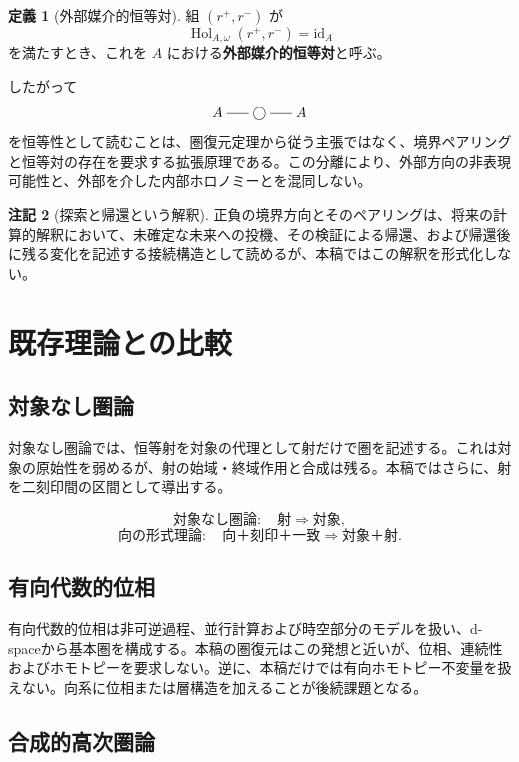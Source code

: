 \documentclass[a4paper,11pt]{ltjsarticle}
\theoremstyle{definition}
\newtheorem{definition}{定義}[section]
\newtheorem{remark}[definition]{注記}
\theoremstyle{plain}
\newcommand{\Hol}{\operatorname{Hol}}
\newcommand{\id}{\mathrm{id}}
\newcommand{\dfix}{\bigcirc}
\newcommand{\dline}{\mathrel{\rule[0.55ex]{1.6em}{0.4pt}}}
\begin{document}
\begin{definition}[外部媒介的恒等対]
組 $(r^+,r^-)$ が
\[
 \Hol_{A,\omega}(r^+,r^-)=\id_A
\]
を満たすとき、これを $A$ における\textbf{外部媒介的恒等対}と呼ぶ。
\end{definition}

したがって
\[
 A\dline\dfix\dline A
\]
を恒等性として読むことは、圏復元定理から従う主張ではなく、境界ペアリングと恒等対の存在を要求する拡張原理である。この分離により、外部方向の非表現可能性と、外部を介した内部ホロノミーとを混同しない。

\begin{remark}[探索と帰還という解釈]
正負の境界方向とそのペアリングは、将来の計算的解釈において、未確定な未来への投機、その検証による帰還、および帰還後に残る変化を記述する接続構造として読めるが、本稿ではこの解釈を形式化しない。
\end{remark}

\section{既存理論との比較}

\subsection{対象なし圏論}

対象なし圏論では、恒等射を対象の代理として射だけで圏を記述する\cite{HellerKról2016}。これは対象の原始性を弱めるが、射の始域・終域作用と合成は残る。本稿ではさらに、射を二刻印間の区間として導出する。

\[
 \text{対象なし圏論}:
 \quad\text{射}\Longrightarrow\text{対象},
\]
\[
 \text{向の形式理論}:
 \quad\text{向＋刻印＋一致}
 \Longrightarrow\text{対象＋射}.
\]

\subsection{有向代数的位相}

有向代数的位相は非可逆過程、並行計算および時空部分のモデルを扱い、d-spaceから基本圏を構成する\cite{Grandis2003Directed}。本稿の圏復元はこの発想と近いが、位相、連続性およびホモトピーを要求しない。逆に、本稿だけでは有向ホモトピー不変量を扱えない。向系に位相または層構造を加えることが後続課題となる。

\subsection{合成的高次圏論}
\end{document}

